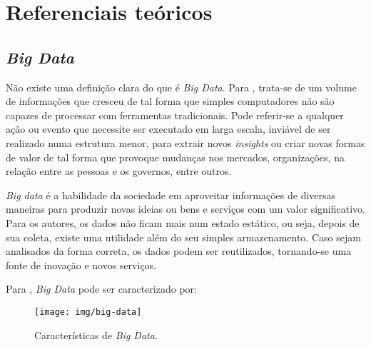 \part{Referenciais teóricos}

\chapter{\emph{Big Data}}

Não existe uma definição clara do que é \emph{Big Data}. Para , trata-se de um volume de informações que cresceu de tal forma que simples computadores não são capazes de processar com ferramentas tradicionais. Pode referir-se a qualquer ação ou evento que necessite ser executado em larga escala, inviável de ser realizado numa estrutura menor, para extrair novos \emph{insights} ou criar novas formas de valor de tal forma que provoque mudanças nos mercados, organizações, na relação entre as pessoas e os governos, entre outros.


\emph{Big data} é a habilidade da sociedade em aproveitar informações de diversas maneiras para produzir novas ideias ou bens e serviços com um valor significativo\cite[p. 2]{CUKIER}. Para os autores, os dados não ficam mais num estado estático, ou seja, depois de sua coleta, existe uma utilidade além do seu simples armazenamento. Caso sejam analisados da forma correta, os dados podem ser reutilizados, tornando-se uma fonte de inovação e novos serviços.

Para \cite[p. 5]{ZIKO}, \emph{Big Data} pode ser caracterizado por:

\begin{figure}[!ht]
\caption{Características de \emph{Big Data}. }
\centerline{\texttt{[image: img/big-data]}}
\end{figure}

